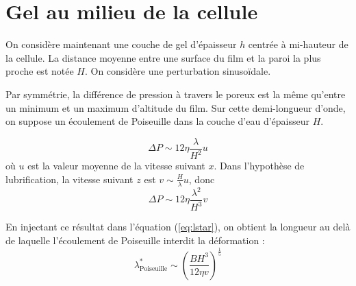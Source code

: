 \documentclass[12pt,a4paper]{article}
\begin{document}
\section{Gel au milieu de la cellule}

\begin{figure}
\end{figure}

On considère maintenant une couche de gel d'épaisseur $h$ centrée à mi-hauteur de la cellule. La distance moyenne entre une surface du film et la paroi la plus proche est notée $H$. On considère une perturbation sinusoïdale.

Par symmétrie, la différence de pression à travers le poreux est la même qu'entre un minimum et un maximum d'altitude du film. Sur cette demi-longueur d'onde, on suppose un écoulement de Poiseuille dans la couche d'eau d'épaisseur $H$. 

\begin{equation}
\Delta P \sim 12\eta\frac{\lambda}{H^2} u
\end{equation}
où $u$ est la valeur moyenne de la vitesse suivant $x$. Dans l'hypothèse de lubrification, la vitesse suivant $z$ est $v\sim \frac{H}{\lambda} u$, donc
\begin{equation}
\Delta P \sim 12\eta\frac{\lambda^2}{H^3} v
\end{equation}

En injectant ce résultat dans l'équation (\ref{eq:lstar}), on obtient la longueur au delà de laquelle l'écoulement de Poiseuille interdit la déformation :
\begin{equation}
\lambda^*_\text{Poiseuille} \sim \left(\frac{B H^3}{12\eta v}\right)^\frac{1}{5}
\end{equation}
\end{document}
